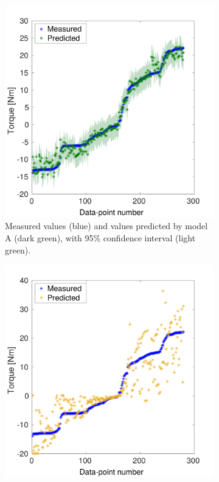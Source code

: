 \begin{figure}%
  \centering%
  \begin{subfigure}[t]{0.48\textwidth}%
    \centering%
    \includegraphics[width=\textwidth]{images/summer_school_study/measured_optimized_torque_A.pdf}%
    \caption{Measured values (blue) and values predicted by model A (dark green), with 95\% confidence interval (light green).}%
    \label{fig:measured_optimized_torque_A}%
  \end{subfigure}%
  \quad
  \begin{subfigure}[t]{0.48\textwidth}%
    \centering%
    \includegraphics[width=\textwidth]{images/summer_school_study/measured_optimized_torque_B.pdf}%

\end{subfigure}
\end{figure}
